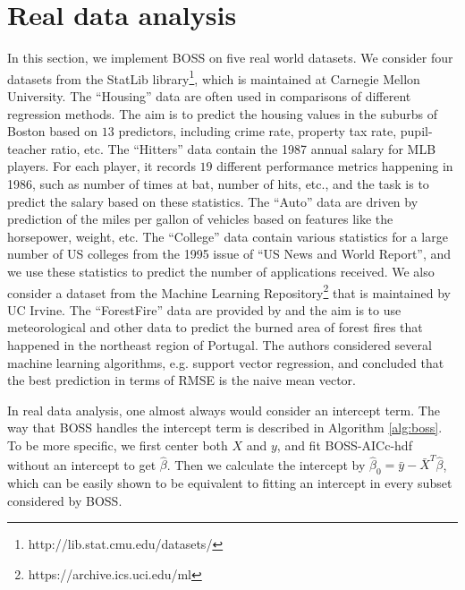 \section{Real data analysis}
\label{sec:real_data}
In this section, we implement BOSS on five real world datasets. We consider four datasets from the StatLib library\footnote{http://lib.stat.cmu.edu/datasets/}, which is maintained at Carnegie Mellon University. The ``Housing'' data are often used in comparisons of different regression methods. The aim is to predict the housing values in the suburbs of Boston based on $13$ predictors, including crime rate, property tax rate, pupil-teacher ratio, etc. The ``Hitters'' data contain the 1987 annual salary for MLB players. For each player, it records $19$ different performance metrics happening in 1986, such as number of times at bat, number of hits, etc., and the task is to predict the salary based on these statistics. The ``Auto'' data are driven by prediction of the miles per gallon of vehicles based on features like the horsepower, weight, etc. The ``College'' data contain various statistics for a large number of US colleges from the 1995 issue of ``US News and World Report'', and we use these statistics to predict the number of applications received. We also consider a dataset from the Machine Learning Repository\footnote{https://archive.ics.uci.edu/ml} that is maintained by UC Irvine. The ``ForestFire'' data are provided by \citet{cortez2007data} and the aim is to use meteorological and other data to predict the burned area of forest fires that happened in the northeast region of Portugal. The authors considered several machine learning algorithms, e.g. support vector regression, and concluded that the best prediction in terms of RMSE is the naive mean vector.


In real data analysis, one almost always would consider an intercept term. The way that BOSS handles the intercept term is described in Algorithm \ref{alg:boss}. To be more specific, we first center both $X$ and $y$, and fit BOSS-AICc-hdf without an intercept to get $\hat{\beta}$. Then we calculate the intercept by $
\hat{\beta}_0=\bar{y} - \bar{X}^T \hat{\beta}$, which can be easily shown to be equivalent to fitting an intercept in every subset considered by BOSS. 

